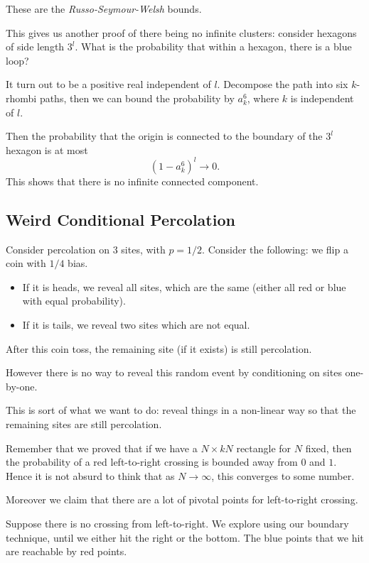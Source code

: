 \documentclass[12pt]{article}
\begin{document}
These are the \emph{Russo-Seymour-Welsh} bounds.

This gives us another proof of there being no infinite clusters: consider hexagons of side length $3^{l}$. What is the probability that within a hexagon, there is a blue loop?

It turn out to be a positive real independent of $l$. Decompose the path into six $k$-rhombi paths, then we can bound the probability by $a_k^{6}$, where $k$ is independent of $l$.

Then the probability that the origin is connected to the boundary of the $3^l$ hexagon is at most
\[
	(1 - a_k^{6})^{l} \to 0.
\]
This shows that there is no infinite connected component.

\subsection{Weird Conditional Percolation}%
\label{sub:wcp}

Consider percolation on $3$ sites, with $p = 1/2$. Consider the following: we flip a coin with $1/4$ bias.
\begin{itemize}
	\item If it is heads, we reveal all sites, which are the same (either all red or blue with equal probability).
	\item If it is tails, we reveal two sites which are not equal.
\end{itemize}

After this coin toss, the remaining site (if it exists) is still percolation.

However there is no way to reveal this random event by conditioning on sites one-by-one.

This is sort of what we want to do: reveal things in a non-linear way so that the remaining sites are still percolation.


Remember that we proved that if we have a $N \times k N$ rectangle for $N$ fixed, then the probability of a red left-to-right crossing is bounded away from $0$ and $1$. Hence it is not absurd to think that as $N \to \infty$, this converges to some number.

Moreover we claim that there are a lot of pivotal points for left-to-right crossing.

Suppose there is no crossing from left-to-right. We explore using our boundary technique, until we either hit the right or the bottom. The blue points that we hit are reachable by red points.
\end{document}
